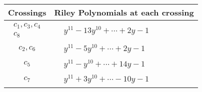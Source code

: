\documentclass[1p]{elsarticle_modified}
\theoremstyle{definition}
\begin{document}
\begin{tabular}{m{50pt}|m{274pt}}
Crossings & \hspace{64pt}Riley Polynomials at each crossing \\
\hline $$\begin{aligned}c_{1},c_{3},c_{4}\\c_{8}\end{aligned}$$&$\begin{aligned}
&y^{11}-13 y^{10}+\cdots+2 y-1
\end{aligned}$\\
\hline $$\begin{aligned}c_{2},c_{6}\end{aligned}$$&$\begin{aligned}
&y^{11}-5 y^{10}+\cdots+2 y-1
\end{aligned}$\\
\hline $$\begin{aligned}c_{5}\end{aligned}$$&$\begin{aligned}
&y^{11}- y^{10}+\cdots+14 y-1
\end{aligned}$\\
\hline $$\begin{aligned}c_{7}\end{aligned}$$&$\begin{aligned}
&y^{11}+3 y^{10}+\cdots-10 y-1
\end{aligned}$\\
\hline
\end{tabular}
\vskip 2pc
\end{document}
